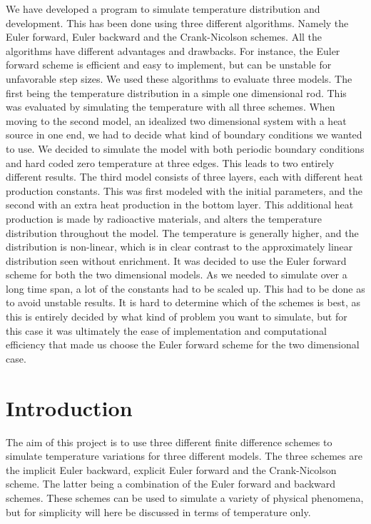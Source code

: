 \documentclass[10pt,a4paper]{article}
\begin{document}
We have developed a program to simulate temperature distribution and development. This has been done using three different algorithms. Namely the Euler forward, Euler backward and the Crank-Nicolson schemes. All the algorithms have different advantages and drawbacks. For instance, the Euler forward scheme is efficient and easy to implement, but can be unstable for unfavorable step sizes. We used these algorithms to evaluate three models. The first being the temperature distribution in a simple one dimensional rod. This was evaluated by simulating the temperature with all three schemes. When moving to the second model, an idealized two dimensional system with a heat source in one end, we had to decide what kind of boundary conditions we wanted to use. We decided to simulate the model with both periodic boundary conditions and hard coded zero temperature at three edges. This leads to two entirely different results. The third model consists of three layers, each with different heat production constants. This was first modeled with the initial parameters, and the second with an extra heat production in the bottom layer. This additional heat production is made by radioactive materials, and alters the temperature distribution throughout the model. The temperature is generally higher, and the distribution is non-linear, which is in clear contrast to the approximately linear distribution seen without enrichment. It was decided to use the Euler forward scheme for both the two dimensional models. As we needed to simulate over a long time span, a lot of the constants had to be scaled up. This had to be done as to avoid unstable results. It is hard to determine which of the schemes is best, as this is entirely decided by what kind of problem you want to simulate, but for this case it was ultimately the ease of implementation and computational efficiency that made us choose the Euler forward scheme for the two dimensional case. 


\newpage
\section*{Introduction}
The aim of this project is to use three different finite difference schemes to simulate temperature variations for three different models. The three schemes are the implicit Euler backward, explicit Euler forward and the Crank-Nicolson scheme. The latter being a combination of the Euler forward and backward schemes. These schemes can be used to simulate a variety of physical phenomena, but for simplicity will here be discussed in terms of temperature only.\\ 
\end{document}
